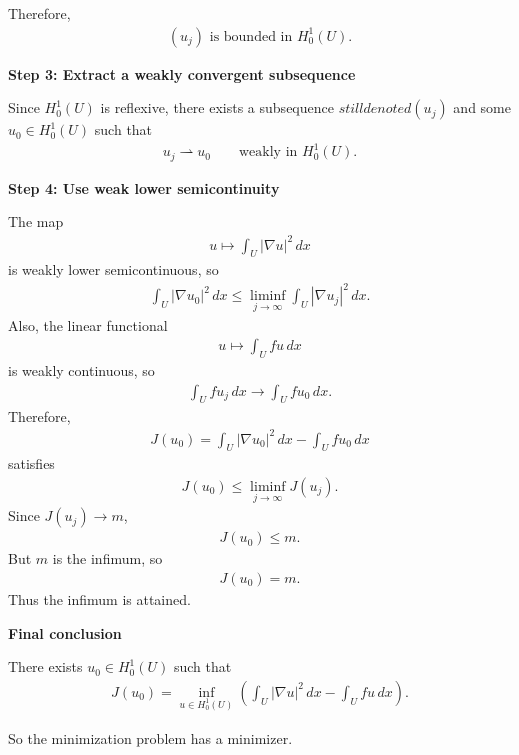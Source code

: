 \begin{description}
Therefore,
\begin{align*}
(u_j)\text{ is bounded in }H_0^1(U).
\end{align*}

\item \textbf{Step 3: Extract a weakly convergent subsequence}

Since $H_0^1(U)$ is reflexive, there exists a subsequence $still denoted (u_j)$ and some $u_0\in H_0^1(U)$ such that
\begin{align*}
u_j\rightharpoonup u_0 \qquad\text{weakly in }H_0^1(U).
\end{align*}

\item \textbf{Step 4: Use weak lower semicontinuity}

The map
\begin{align*}
u\mapsto \int_U |\nabla u|^2\,dx
\end{align*}
is weakly lower semicontinuous, so
\begin{align*}
\int_U |\nabla u_0|^2\,dx \le \liminf_{j\to\infty} \int_U |\nabla u_j|^2\,dx.
\end{align*}
Also, the linear functional
\begin{align*}
u\mapsto \int_U fu\,dx
\end{align*}
is weakly continuous, so
\begin{align*}
\int_U fu_j\,dx \to \int_U fu_0\,dx.
\end{align*}
Therefore,
\begin{align*}
J(u_0) = \int_U |\nabla u_0|^2\,dx-\int_U fu_0\,dx
\end{align*}
satisfies
\begin{align*}
J(u_0) \le \liminf_{j\to\infty} J(u_j).
\end{align*}
Since $J(u_j)\to m$,
\begin{align*}
J(u_0)\le m.
\end{align*}
But $m$ is the infimum, so
\begin{align*}
J(u_0)=m.
\end{align*}
Thus the infimum is attained.

\item \textbf{Final conclusion}

There exists $u_0\in H_0^1(U)$ such that
\begin{align*}
\boxed{
J(u_0)= \inf_{u\in H_0^1(U)} \left( \int_U |\nabla u|^2\,dx-\int_U fu\,dx \right).
}
\end{align*}

So the minimization problem has a minimizer.


\end{description}
